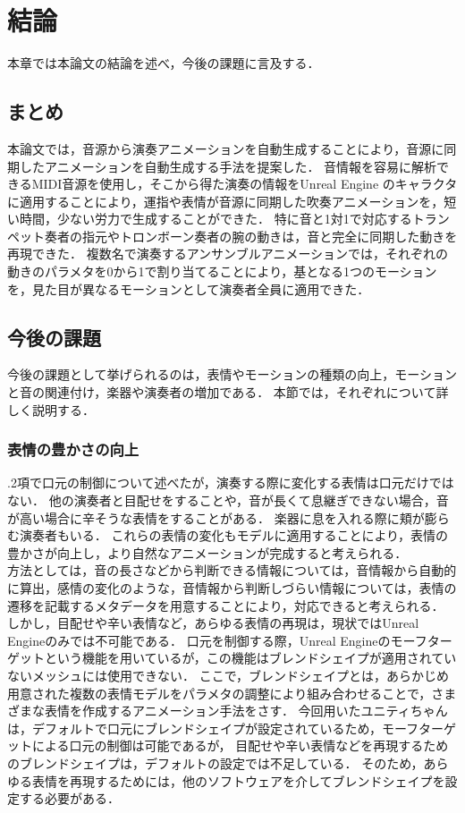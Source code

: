 \chapter{結論}
\label{chap:conclusion}
本章では本論文の結論を述べ，今後の課題に言及する．

\section{まとめ}
本論文では，音源から演奏アニメーションを自動生成することにより，音源に同期したアニメーションを自動生成する手法を提案した．
音情報を容易に解析できるMIDI音源を使用し，そこから得た演奏の情報をUnreal Engine のキャラクタに適用することにより，運指や表情が音源に同期した吹奏アニメーションを，短い時間，少ない労力で生成することができた．
特に音と1対1で対応するトランペット奏者の指元やトロンボーン奏者の腕の動きは，音と完全に同期した動きを再現できた．
複数名で演奏するアンサンブルアニメーションでは，それぞれの動きのパラメタを0から1で割り当てることにより，基となる1つのモーションを，見た目が異なるモーションとして演奏者全員に適用できた．

\section{今後の課題}
今後の課題として挙げられるのは，表情やモーションの種類の向上，モーションと音の関連付け，楽器や演奏者の増加である．
本節では，それぞれについて詳しく説明する．

\subsection{表情の豊かさの向上}
{.2項}で口元の制御について述べたが，演奏する際に変化する表情は口元だけではない．
他の演奏者と目配せをすることや，音が長くて息継ぎできない場合，音が高い場合に辛そうな表情をすることがある．
楽器に息を入れる際に頬が膨らむ演奏者もいる．
これらの表情の変化もモデルに適用することにより，表情の豊かさが向上し，より自然なアニメーションが完成すると考えられる．\\
\indent
方法としては，音の長さなどから判断できる情報については，音情報から自動的に算出，感情の変化のような，音情報から判断しづらい情報については，表情の遷移を記載するメタデータを用意することにより，対応できると考えられる．\\
\indent
しかし，目配せや辛い表情など，あらゆる表情の再現は，現状ではUnreal Engineのみでは不可能である．
口元を制御する際，Unreal Engineのモーフターゲットという機能を用いているが，この機能はブレンドシェイプが適用されていないメッシュには使用できない．
ここで，ブレンドシェイプとは，あらかじめ用意された複数の表情モデルをパラメタの調整により組み合わせることで，さまざまな表情を作成するアニメーション手法をさす．
今回用いたユニティちゃんは，デフォルトで口元にブレンドシェイプが設定されているため，モーフターゲットによる口元の制御は可能であるが，
目配せや辛い表情などを再現するためのブレンドシェイプは，デフォルトの設定では不足している．
そのため，あらゆる表情を再現するためには，他のソフトウェアを介してブレンドシェイプを設定する必要がある．

